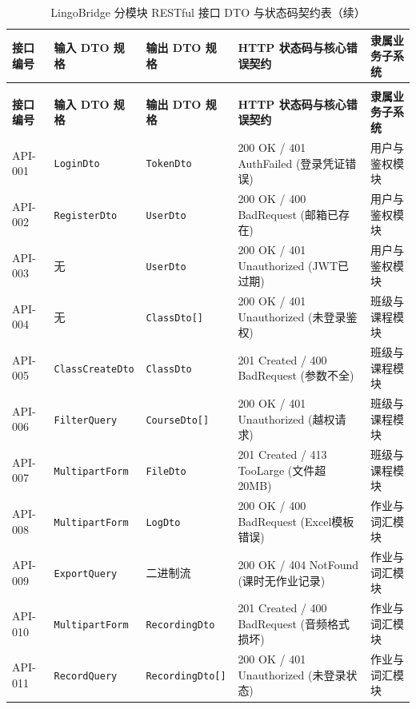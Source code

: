 \begingroup
\footnotesize
\setlength{\tabcolsep}{3pt}
\renewcommand{\arraystretch}{1.18}
\begin{longtable}{@{}p{1.25cm} p{2.45cm} p{2.55cm} p{4.2cm} p{2.4cm}@{}}
\caption{LingoBridge 分模块 RESTful 接口 DTO 与状态码契约表} \label{tab:api_detail} \\
\toprule
\textbf{接口编号} & \textbf{输入 DTO 规格} & \textbf{输出 DTO 规格} & \textbf{HTTP 状态码与核心错误契约} & \textbf{隶属业务子系统} \\
\midrule
\endfirsthead
\caption[]{LingoBridge 分模块 RESTful 接口 DTO 与状态码契约表（续）} \\
\toprule
\textbf{接口编号} & \textbf{输入 DTO 规格} & \textbf{输出 DTO 规格} & \textbf{HTTP 状态码与核心错误契约} & \textbf{隶属业务子系统} \\
\midrule
\endhead
\bottomrule
\endfoot
API-001 & \texttt{Login\allowbreak Dto} & \texttt{Token\allowbreak Dto} & 200 OK / 401 AuthFailed (登录凭证错误) & 用户与鉴权模块 \\
API-002 & \texttt{Register\allowbreak Dto} & \texttt{User\allowbreak Dto} & 200 OK / 400 BadRequest (邮箱已存在) & 用户与鉴权模块 \\
API-003 & 无 & \texttt{User\allowbreak Dto} & 200 OK / 401 Unauthorized (JWT已过期) & 用户与鉴权模块 \\
API-004 & 无 & \texttt{Class\allowbreak Dto[]} & 200 OK / 401 Unauthorized (未登录鉴权) & 班级与课程模块 \\
API-005 & \texttt{Class\allowbreak Create\allowbreak Dto} & \texttt{Class\allowbreak Dto} & 201 Created / 400 BadRequest (参数不全) & 班级与课程模块 \\
API-006 & \texttt{Filter\allowbreak Query} & \texttt{Course\allowbreak Dto[]} & 200 OK / 401 Unauthorized (越权请求) & 班级与课程模块 \\
API-007 & \texttt{Multipart\allowbreak Form} & \texttt{File\allowbreak Dto} & 201 Created / 413 TooLarge (文件超20MB) & 班级与课程模块 \\
API-008 & \texttt{Multipart\allowbreak Form} & \texttt{Log\allowbreak Dto} & 200 OK / 400 BadRequest (Excel模板错误) & 作业与词汇模块 \\
API-009 & \texttt{Export\allowbreak Query} & 二进制流 & 200 OK / 404 NotFound (课时无作业记录) & 作业与词汇模块 \\
API-010 & \texttt{Multipart\allowbreak Form} & \texttt{Recording\allowbreak Dto} & 201 Created / 400 BadRequest (音频格式损坏) & 作业与词汇模块 \\
API-011 & \texttt{Record\allowbreak Query} & \texttt{Recording\allowbreak Dto[]} & 200 OK / 401 Unauthorized (未登录状态) & 作业与词汇模块 \\

\end{longtable}
